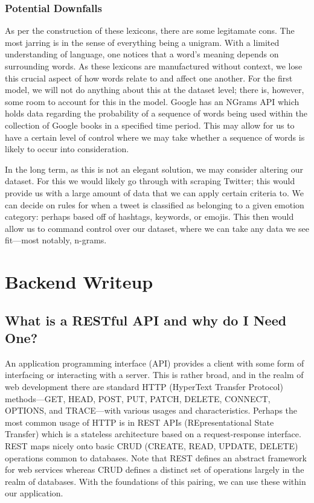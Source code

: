 \documentclass[11pt, twoside, reqno]{book}
\begin{document}
\subsection{Potential Downfalls}

As per the construction of these lexicons, there are some legitamate cons. The most jarring is in the sense of everything being a unigram. With a limited understanding of language, one notices that a word's meaning depends on surrounding words. As these lexicons are manufactured without context, we lose this crucial aspect of how words relate to and affect one another. For the first model, we will not do anything about this at the dataset level; there is, however, some room to account for this in the model. Google has an NGrams API which holds data regarding the probability of a sequence of words being used within the collection of Google books in a specified time period. This may allow for us to have a certain level of control where we may take whether a sequence of words is likely to occur into consideration.

In the long term, as this is not an elegant solution, we may consider altering our dataset. For this we would likely go through with scraping Twitter; this would provide us with a large amount of data that we can apply certain criteria to. We can decide on rules for when a tweet is classified as belonging to a given emotion category: perhaps based off of hashtags, keywords, or emojis. This then would allow us to command control over our dataset, where we can take any data we see fit—most notably, n-grams.

\chapter{Backend Writeup}

\section{What is a RESTful API and why do I Need One?}

An application programming interface (API) provides a client with some form of interfacing or interacting with a server. This is rather broad, and in the realm of web development there are standard HTTP (HyperText Transfer Protocol) methods—GET, HEAD, POST, PUT, PATCH, DELETE, CONNECT, OPTIONS, and TRACE—with various usages and characteristics. Perhaps the most common usage of HTTP is in REST APIs (REpresentational State Transfer) which is a stateless architecture based on a request-response interface. REST maps nicely onto basic CRUD (CREATE, READ, UPDATE, DELETE) operations common to databases. Note that REST defines an abstract framework for web services whereas CRUD defines a distinct set of operations largely in the realm of databases. With the foundations of this pairing, we can use these within our application.
\end{document}
